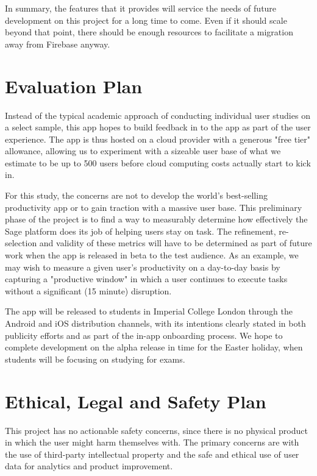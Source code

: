 In summary, the features that it provides will service the needs of future development on this project for a long time to come. Even if it should scale beyond that point, there should be enough resources to facilitate a migration away from Firebase anyway.

\section{Evaluation Plan}
Instead of the typical academic approach of conducting individual user studies on a select sample, this app hopes to build feedback in to the app as part of the user experience. The app is thus hosted on a cloud provider with a generous "free tier" allowance, allowing us to experiment with a sizeable user base of what we estimate to be up to 500 users before cloud computing costs actually start to kick in.

For this study, the concerns are not to develop the world's best-selling productivity app or to gain traction with a massive user base. This preliminary phase of the project is to find a way to measurably determine how effectively the Sage platform does its job of helping users stay on task. The refinement, re-selection and validity of these metrics will have to be determined as part of future work when the app is released in beta to the test audience. As an example, we may wish to measure a given user's productivity on a day-to-day basis by capturing a "productive window" in which a user continues to execute tasks without a significant (15 minute) disruption.

The app will be released to students in Imperial College London through the Android and iOS distribution channels, with its intentions clearly stated in both publicity efforts and as part of the in-app onboarding process. We hope to complete development on the alpha release in time for the Easter holiday, when students will be focusing on studying for exams.

\section{Ethical, Legal and Safety Plan}
This project has no actionable safety concerns, since there is no physical product in which the user might harm themselves with. The primary concerns are with the use of third-party intellectual property and the safe and ethical use of user data for analytics and product improvement.

